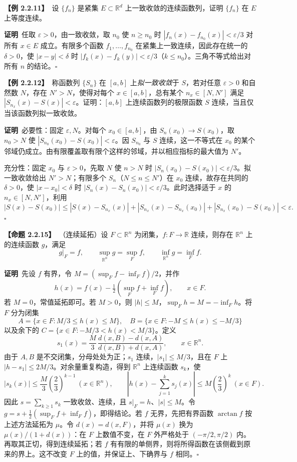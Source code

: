 \documentclass[UTF8,a4paper,11pt]{ctexart}
\newcommand{\ex}[1]{\par\medskip\noindent\textbf{【例 #1】}\ }
\newcommand{\prop}[1]{\par\medskip\noindent\textbf{【命题 #1】}\ }
\newcommand{\pf}{\par\noindent\textbf{证明}\ }
\begin{document}
\ex{2.2.11}设 $\{f_n\}$ 是紧集 $E\subset\mathbb R^d$ 上一致收敛的连续函数列，证明 $\{f_n\}$ 在 $E$ 上等度连续。
\pf 任取 $\varepsilon>0$，由一致收敛，取 $n_0$ 使 $n\ge n_0$ 时 $|f_n(x)-f_{n_0}(x)|<\varepsilon/3$ 对所有 $x\in E$ 成立。有限多个函数 $f_1,\ldots,f_{n_0}$ 在紧集上一致连续，因此存在统一的 $\delta>0$，使 $|x-y|<\delta$ 时 $|f_k(x)-f_k(y)|<\varepsilon/3$（$k\le n_0$）。三角不等式给出对所有 $n$ 的结论。\hfill$\square$

\ex{2.2.12}称函数列 $\{S_n\}$ 在 $[a,b]$ 上\emph{拟一致收敛}于 $S$，若对任意 $\varepsilon>0$ 和自然数 $N$，存在 $N'>N$，使得对每个 $x\in[a,b]$，总有某个 $n_x\in[N,N']$ 满足 $|S_{n_x}(x)-S(x)|<\varepsilon$。证明：$[a,b]$ 上连续函数列的极限函数 $S$ 连续，当且仅当该函数列拟一致收敛。
\pf 必要性：固定 $\varepsilon,N$。对每个 $x_0\in[a,b]$，由 $S_n(x_0)\to S(x_0)$，取 $n_0>N$ 使 $|S_{n_0}(x_0)-S(x_0)|<\varepsilon$。因 $S_{n_0}$ 与 $S$ 连续，这一不等式在 $x_0$ 的某个邻域仍成立。由有限覆盖取有限个这样的邻域，并以相应指标的最大值为 $N'$。

充分性：固定 $x_0$ 与 $\varepsilon>0$，先取 $N$ 使 $n>N$ 时 $|S_n(x_0)-S(x_0)|<\varepsilon/3$。拟一致收敛给出 $N'>N$；有限多个 $S_n$（$N\le n\le N'$）在 $x_0$ 连续，故存在共同的 $\delta>0$，使 $|x-x_0|<\delta$ 时 $|S_n(x)-S_n(x_0)|<\varepsilon/3$。此时选择适于 $x$ 的 $n_x\in[N,N']$，利用
\[
|S(x)-S(x_0)|\le |S(x)-S_{n_x}(x)|+|S_{n_x}(x)-S_{n_x}(x_0)|+|S_{n_x}(x_0)-S(x_0)|<\varepsilon.
\]\hfill$\square$

\prop{2.2.15}（连续延拓）设 $F\subset\mathbb R^n$ 为闭集，$f:F\to\mathbb R$ 连续，则存在 $\mathbb R^n$ 上的连续函数 $g$，满足
\[
g|_F=f,\qquad \sup_{\mathbb R^n}g=\sup_F f,\qquad \inf_{\mathbb R^n}g=\inf_F f.
\]
\pf 先设 $f$ 有界，令 $M=(\sup_F f-\inf_F f)/2$，并作
\[
h(x)=f(x)-\tfrac12(\sup_Ff+\inf_Ff),\qquad x\in F.
\]
若 $M=0$，常值延拓即可。若 $M>0$，则 $|h|\le M$，$\sup_Fh=M=-\inf_Fh$。将 $F$ 分为闭集
\[
A=\{x\in F:M/3\le h(x)\le M\},\quad
B=\{x\in F:-M\le h(x)\le-M/3\}
\]
以及余下的 $C=\{x\in F:-M/3<h(x)<M/3\}$。定义
\[
s_1(x)=\frac M3\,\frac{d(x,B)-d(x,A)}{d(x,B)+d(x,A)},\qquad x\in\mathbb R^n.
\]
由于 $A,B$ 是不交闭集，分母处处为正；$s_1$ 连续，$|s_1|\le M/3$，且在 $F$ 上 $|h-s_1|\le2M/3$。对余量重复构造，得到 $\mathbb R^n$ 上连续函数 $s_k$，使
\[
|s_k(x)|\le \frac M3\left(\frac23\right)^{k-1}\ (x\in\mathbb R^n),\qquad
\left|h(x)-\sum_{j=1}^ks_j(x)\right|\le M\left(\frac23\right)^k\ (x\in F).
\]
因此 $s=\sum_{k\ge1}s_k$ 一致收敛、连续，且 $s|_F=h$、$|s|\le M$。令 $g=s+\tfrac12(\sup_Ff+\inf_Ff)$，即得结论。若 $f$ 无界，先把有界函数 $\arctan f$ 按上述方法延拓为 $\mu$。令 $d(x)=d(x,F)$，并将 $\mu(x)$ 换为 $\mu(x)/(1+d(x))$：在 $F$ 上数值不变，在 $F$ 外严格处于 $(-\pi/2,\pi/2)$ 内。再取其正切，得到连续延拓；若 $f$ 有有限的单侧界，则将所得函数在该侧截到原来的界上。这不改变 $F$ 上的值，并保证上、下确界与 $f$ 相同。\hfill$\square$
\end{document}
